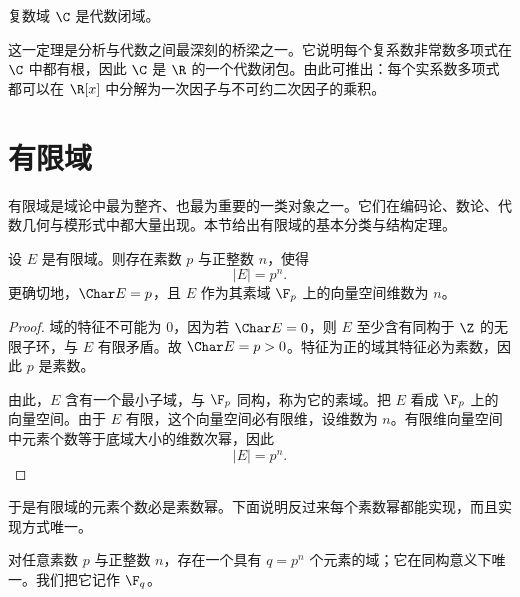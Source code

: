 \begin{theorem}[代数学基本定理]
复数域 $\C$ 是代数闭域。
\end{theorem}

\begin{remark}
这一定理是分析与代数之间最深刻的桥梁之一。它说明每个复系数非常数多项式在 $\C$ 中都有根，因此 $\C$ 是 $\R$ 的一个代数闭包。由此可推出：每个实系数多项式都可以在 $\R[x]$ 中分解为一次因子与不可约二次因子的乘积。
\end{remark}

\section{有限域}

有限域是域论中最为整齐、也最为重要的一类对象之一。它们在编码论、数论、代数几何与模形式中都大量出现。本节给出有限域的基本分类与结构定理。

\begin{proposition}
设 $E$ 是有限域。则存在素数 $p$ 与正整数 $n$，使得
\[
|E|=p^n.
\]
更确切地，$\Char E=p$，且 $E$ 作为其素域 $\F_p$ 上的向量空间维数为 $n$。
\end{proposition}

\begin{proof}
域的特征不可能为 $0$，因为若 $\Char E=0$，则 $E$ 至少含有同构于 $\Z$ 的无限子环，与 $E$ 有限矛盾。故 $\Char E=p>0$。特征为正的域其特征必为素数，因此 $p$ 是素数。

由此，$E$ 含有一个最小子域，与 $\F_p$ 同构，称为它的素域。把 $E$ 看成 $\F_p$ 上的向量空间。由于 $E$ 有限，这个向量空间必有限维，设维数为 $n$。有限维向量空间中元素个数等于底域大小的维数次幂，因此
\[
|E|=p^n.
\]
\end{proof}

于是有限域的元素个数必是素数幂。下面说明反过来每个素数幂都能实现，而且实现方式唯一。

\begin{theorem}[有限域的存在与唯一性]
对任意素数 $p$ 与正整数 $n$，存在一个具有 $q=p^n$ 个元素的域；它在同构意义下唯一。我们把它记作 $\F_q$。
\end{theorem}

